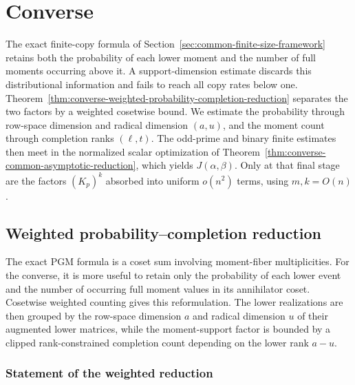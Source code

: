 \documentclass[11pt]{article}
\newcommand{\1}{\mathbf 1}
\theoremstyle{plain}
\theoremstyle{definition}
\theoremstyle{remark}
\begin{document}
\section{Converse}
\label{sec:converse}
The exact finite-copy formula of
Section~\ref{sec:common-finite-size-framework} retains both the probability
of each lower moment and the number of full moments occurring above it.
A support-dimension estimate discards this distributional information and
fails to reach all copy rates below one.
Theorem~\ref{thm:converse-weighted-probability-completion-reduction} separates
the two factors by a weighted cosetwise bound.  We estimate the probability
through row-space dimension and radical dimension $(a,u)$, and the moment
count through completion ranks $(\ell,t)$.  The odd-prime and binary finite
estimates then meet in the normalized scalar optimization of
Theorem~\ref{thm:converse-common-asymptotic-reduction}, which yields
$J(\alpha,\beta)$.  Only at that final stage are the factors $(K_p)^k$
absorbed into uniform $o(n^2)$ terms, using $m,k=O(n)$.

\subsection{Weighted probability--completion reduction}
\label{sec:unreported-reduction}

The exact PGM formula is a coset sum involving moment-fiber
multiplicities.  For the converse, it is more useful to retain only the
probability of each lower event and the number of occurring full moment values
in its annihilator coset.  Cosetwise weighted counting gives this reformulation.
The lower realizations are then grouped by the row-space dimension $a$ and
radical dimension $u$ of their augmented lower matrices, while the
moment-support factor is bounded by a clipped rank-constrained completion
count depending on the lower rank $a-u$.

\subsubsection{Statement of the weighted reduction}
\label{subsubsec:weighted-reduction-statement}
\end{document}
